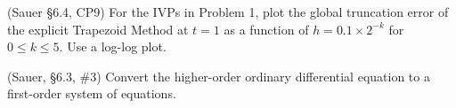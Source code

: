 \documentclass[12pt,fleqn]{exam}
\begin{document}
\begin{questions}
\question (Sauer \S6.4, CP9) For the IVPs in Problem 1, plot the global truncation error of the explicit Trapezoid Method at $t = 1$ as a function of $h = 0.1 \times 2^{-k}$ for $0 \leq k \leq 5$. Use a log-log plot.

\question (Sauer, \S6.3, \#3) Convert the higher-order ordinary differential equation to a first-order system of equations.




\end{questions}
\end{document}
